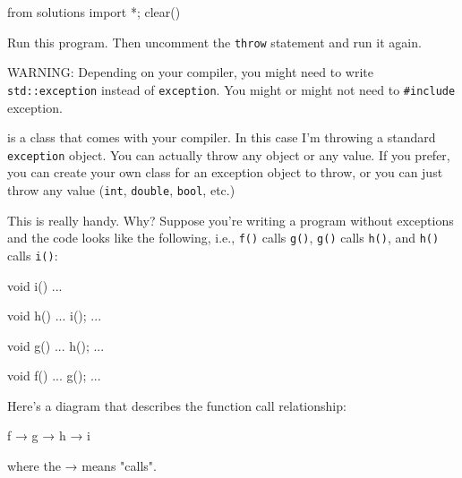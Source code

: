 \begin{python0}
from solutions import *; clear()
\end{python0}

Run this program. Then uncomment the \texttt{throw} statement and run it
again.


WARNING: Depending on your compiler, you might need to write
\texttt{std::exception} instead of \texttt{exception}. You might or might
not need to \texttt{\#include} exception.

\texttt{} is a class that comes with your compiler. In this case I'm throwing a standard \texttt{exception} object. You can actually throw any object or any value. If you prefer, you can create your own class for an exception object to throw, or you can just throw any value (\texttt{int}, \texttt{double}, \texttt{bool}, etc.)

This is really handy. Why? Suppose you're writing a program without exceptions and the code looks like the following, i.e., \texttt{f()} calls \texttt{g()}, \texttt{g()} calls \texttt{h()}, and \texttt{h()} calls \texttt{i()}:

\begin{console}
void i()
{    
     ...
}

void h()
{    
     ...
     i();
     ...
}

void g()
{    
     ...
     h();
     ...
}

void f()
{    
     ...
     g();
     ...
}
\end{console}

Here's a diagram that describes the function call
relationship:
\begin{console}
f → g → h → i
\end{console}
where the → means "calls".

